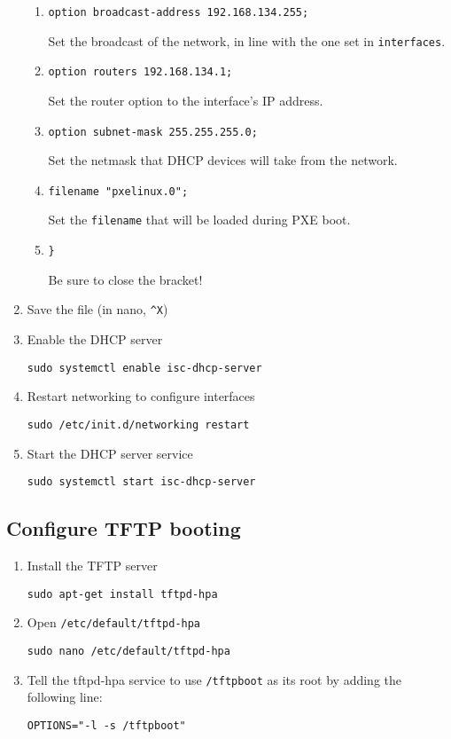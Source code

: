 \documentclass{article}
\begin{document}
\begin{flushleft}
\begin{enumerate}
\begin{enumerate}
    \item \verb|option broadcast-address 192.168.134.255;|

    Set the broadcast of the network, in line with the one set in \verb|interfaces|.

    \item \verb|option routers 192.168.134.1;|

    Set the router option to the interface's IP address.

    \item \verb|option subnet-mask 255.255.255.0;|

    Set the netmask that DHCP devices will take from the network.

    \item \verb|filename "pxelinux.0";|

    Set the \verb|filename| that will be loaded during PXE boot.

    \item \verb|}|

    Be sure to close the bracket!
  \end{enumerate}
  \item Save the file (in nano, \verb|^X|)
  \item Enable the DHCP server

  \verb|sudo systemctl enable isc-dhcp-server|
  \item Restart networking to configure interfaces

  \verb|sudo /etc/init.d/networking restart|
  \item Start the DHCP server service

  \verb|sudo systemctl start isc-dhcp-server|
\end{enumerate}
\subsection{Configure TFTP booting}
\begin{enumerate}
  \item Install the TFTP server

  \verb|sudo apt-get install tftpd-hpa|
  \item Open \verb|/etc/default/tftpd-hpa|

  \verb|sudo nano /etc/default/tftpd-hpa|

  \item Tell the tftpd-hpa service to use \verb|/tftpboot| as its root by adding the following line:

  \verb|OPTIONS="-l -s /tftpboot"|


\end{enumerate}
\end{flushleft}
\end{document}
